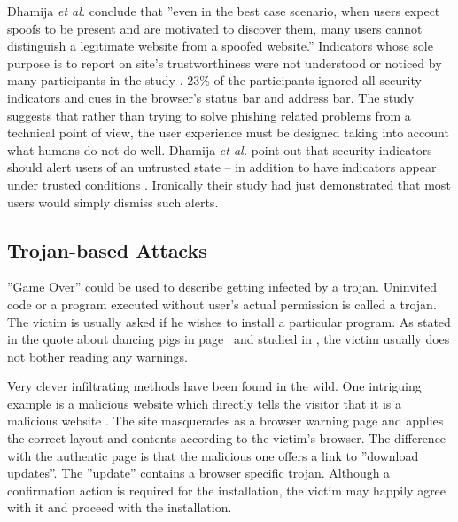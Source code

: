 \documentclass[english,gradu]{tktltiki}
\begin{document}
              Dhamija \emph{et al.} conclude \cite{why_phishing_works_06} that ''even in the best case scenario, when users expect spoofs to be present and are motivated to discover them, many users cannot distinguish a legitimate website from a spoofed website.'' Indicators whose sole purpose is to report on site's trustworthiness were not understood or noticed by many participants in the study \cite{why_phishing_works_06}. 23\% of the participants ignored all security indicators and cues in the browser's status bar and address bar. The study suggests that rather than trying to solve phishing related problems from a technical point of view, the user experience must be designed taking into account what humans do not do well. Dhamija \emph{et al.} point out that security indicators should alert users of an untrusted state -- in addition to have indicators appear under trusted conditions \cite{why_phishing_works_06}. Ironically their study had just demonstrated that most users would simply dismiss such alerts.



\subsection{Trojan-based Attacks} %
\label{sub:trojan_based_attacks}

            \label{sec:trojans}

            ''Game Over'' could be used to describe getting infected by a trojan. Uninvited code or a program executed without user's actual permission is called a trojan. The victim is usually asked if he wishes to install a particular program. As stated in the quote about dancing pigs in page~\pageref{quote:dancing_pigs} and studied in \cite{why_phishing_works_06}, the victim usually does not bother reading any warnings.

              Very clever infiltrating methods have been found in the wild. One intriguing example is a malicious website which directly tells the visitor that it is a malicious website \cite{fsecure_webtrojan_2010}. The site masquerades as a browser warning page and applies the correct layout and contents according to the victim's browser. The difference with the authentic page is that the malicious one offers a link to ''download updates''. The ''update'' contains a browser specific trojan. Although a confirmation action is required for the installation, the victim may happily agree with it and proceed with the installation.
\end{document}
